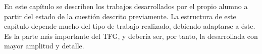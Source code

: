 En este capítulo se describen los trabajos desarrollados por el propio alumno a partir del estado de la cuestión descrito previamente. La estructura de este capítulo depende mucho del tipo de trabajo realizado, debiendo adaptarse a éste. Es la parte más importante del TFG, y debería ser, por tanto, la desarrollada con mayor amplitud y detalle.


